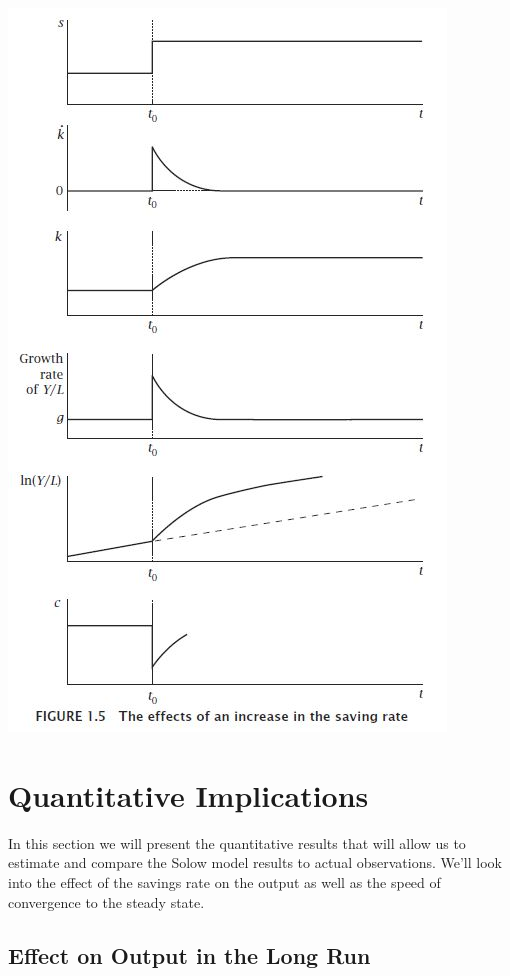 \documentclass[12pt]{report}
\begin{document}
\begin{center}
\includegraphics[scale=0.75]{images/solowsshock}
\end{center}

\section{Quantitative Implications}

In this section we will present the quantitative results that will allow us to estimate and compare the Solow model results to actual observations. We'll look into the effect of the savings rate on the output as well as the speed of convergence to the steady state.

\subsection{Effect on Output in the Long Run}
\end{document}
